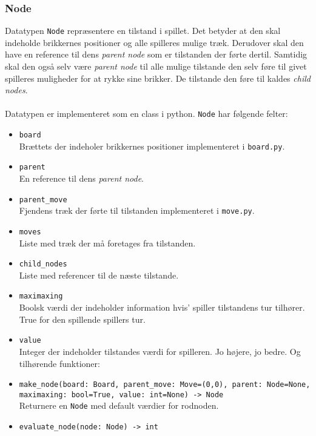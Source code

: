 \subsubsection{Node}
Datatypen \texttt{Node} repræsentere en tilstand i spillet. Det betyder at den
skal indeholde brikkernes positioner og alle spilleres mulige træk. Derudover skal
den have en reference til dens \textit{parent node} som er tilstanden der førte dertil. Samtidig skal
den også selv være \textit{parent node} til alle mulige tilstande den selv føre til givet spilleres
muligheder for at rykke sine brikker. De tilstande den føre til kaldes \textit{child nodes}.\\
\\
Datatypen er implementeret som en class i python. 
\bigbreak
\texttt{Node} har følgende felter:
\begin{itemize}
    \item \texttt{board}\\
    Brættets der indeholer brikkernes positioner implementeret i \texttt{board.py}.
    \item \texttt{parent}\\
    En reference til dens \textit{parent node}.
    \item \texttt{parent\_move}\\
    Fjendens træk der førte til tilstanden implementeret i \texttt{move.py}.
    \item \texttt{moves}\\
    Liste med træk der må foretages fra tilstanden.
    \item \texttt{child\_nodes}\\
    Liste med referencer til de næste tilstande.
    \item \texttt{maximaxing}\\
    Boolsk værdi der indeholder information hvis' spiller tilstandens tur tilhører. True for den spillende spillers tur.
    \item \texttt{value}\\
    Integer der indeholder tilstandes værdi for spilleren. Jo højere, jo bedre.
    \bigbreak
    Og tilhørende funktioner:
    \item \texttt{make\_node(board: Board, parent\_move: Move=(0,0), parent: Node=None, maximaxing: bool=True, value: int=None) -> Node}\\
    Returnere en \texttt{Node} med default værdier for rodnoden.
    \item \texttt{evaluate\_node(node: Node) -> int} \\

\end{itemize}
